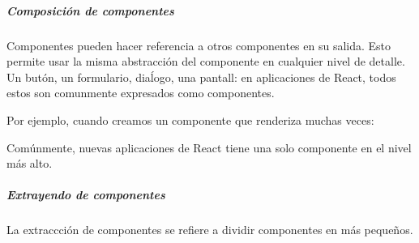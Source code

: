 \subparagraph{Composición de componentes}
\label{\detokenize{reactjs:composicion-de-componentes}}
Componentes pueden hacer referencia a otros componentes en su salida. Esto
permite usar la misma abstracción del componente en cualquier nivel de detalle.
Un butón, un formulario, diaĺogo, una pantall: en aplicaciones de React, todos
estos son comunmente expresados como componentes.

Por ejemplo, cuando creamos un componente  que renderiza 
muchas veces:

%
\begin{sphinxVerbatim}[commandchars=\\\{\}]
  
    

  
   
        
        
        

   
\end{sphinxVerbatim}

Comúnmente, nuevas aplicaciones de React tiene una solo componente 
en el nivel más alto.


\subparagraph{Extrayendo de componentes}
\label{\detokenize{reactjs:extrayendo-de-componentes}}
La extraccción de componentes se refiere a dividir componentes en más pequeños.


